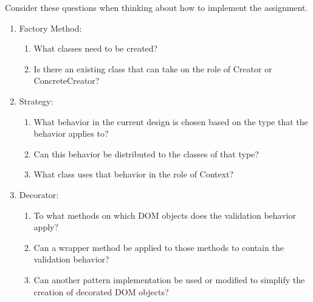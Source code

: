 \documentclass{article}
\begin{document}
Consider these questions when thinking about how to implement the assignment.
\begin{enumerate}
    \item Factory Method:
          \begin{enumerate}
              \item What classes need to be created?
              \item Is there an existing class that can take on the role of Creator or ConcreteCreator?
          \end{enumerate}
    \item Strategy:
          \begin{enumerate}
              \item What behavior in the current design is chosen based on the type that the behavior applies to?
              \item Can this behavior be distributed to the classes of that type?
              \item What class uses that behavior in the role of Context?
          \end{enumerate}
    \item Decorator:
          \begin{enumerate}
              \item To what methods on which DOM objects does the validation behavior apply?
              \item Can a wrapper method be applied to those methods to contain the validation behavior?
              \item Can another pattern implementation be used or modified to simplify the creation of decorated DOM objects?
          \end{enumerate}
\end{enumerate}
\end{document}
